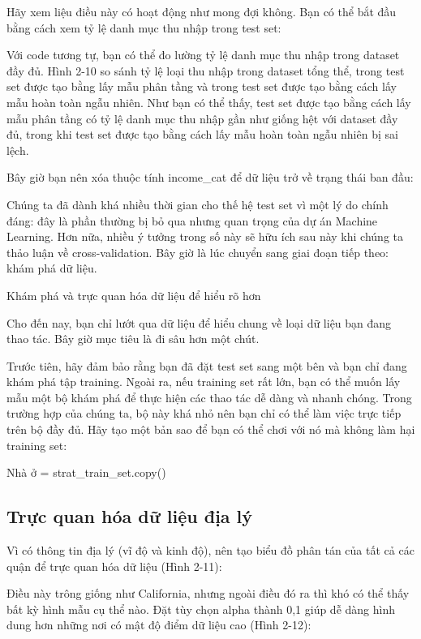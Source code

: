 Hãy xem liệu điều này có hoạt động như mong đợi không. Bạn có thể bắt đầu bằng cách xem tỷ lệ danh mục thu nhập trong test set:

Với code tương tự, bạn có thể đo lường tỷ lệ danh mục thu nhập trong dataset đầy đủ. Hình 2-10 so sánh tỷ lệ loại thu nhập trong dataset tổng thể, trong test set được tạo bằng lấy mẫu phân tầng và trong test set được tạo bằng cách lấy mẫu hoàn toàn ngẫu nhiên. Như bạn có thể thấy, test set được tạo bằng cách lấy mẫu phân tầng có tỷ lệ danh mục thu nhập gần như giống hệt với dataset đầy đủ, trong khi test set được tạo bằng cách lấy mẫu hoàn toàn ngẫu nhiên bị sai lệch.

Bây giờ bạn nên xóa thuộc tính income\_cat để dữ liệu trở về trạng thái ban đầu:

Chúng ta đã dành khá nhiều thời gian cho thế hệ test set vì một lý do chính đáng: đây là phần thường bị bỏ qua nhưng quan trọng của dự án Machine Learning. Hơn nữa, nhiều ý tưởng trong số này sẽ hữu ích sau này khi chúng ta thảo luận về cross-validation. Bây giờ là lúc chuyển sang giai đoạn tiếp theo: khám phá dữ liệu.

Khám phá và trực quan hóa dữ liệu để hiểu rõ hơn

Cho đến nay, bạn chỉ lướt qua dữ liệu để hiểu chung về loại dữ liệu bạn đang thao tác. Bây giờ mục tiêu là đi sâu hơn một chút.

Trước tiên, hãy đảm bảo rằng bạn đã đặt test set sang một bên và bạn chỉ đang khám phá tập training. Ngoài ra, nếu training set rất lớn, bạn có thể muốn lấy mẫu một bộ khám phá để thực hiện các thao tác dễ dàng và nhanh chóng. Trong trường hợp của chúng ta, bộ này khá nhỏ nên bạn chỉ có thể làm việc trực tiếp trên bộ đầy đủ. Hãy tạo một bản sao để bạn có thể chơi với nó mà không làm hại training set:

Nhà ở = strat\_train\_set.copy()

\subsection{Trực quan hóa dữ liệu địa lý}

Vì có thông tin địa lý (vĩ độ và kinh độ), nên tạo biểu đồ phân tán của tất cả các quận để trực quan hóa dữ liệu (Hình 2-11):

Điều này trông giống như California, nhưng ngoài điều đó ra thì khó có thể thấy bất kỳ hình mẫu cụ thể nào. Đặt tùy chọn alpha thành 0,1 giúp dễ dàng hình dung hơn những nơi có mật độ điểm dữ liệu cao (Hình 2-12):

